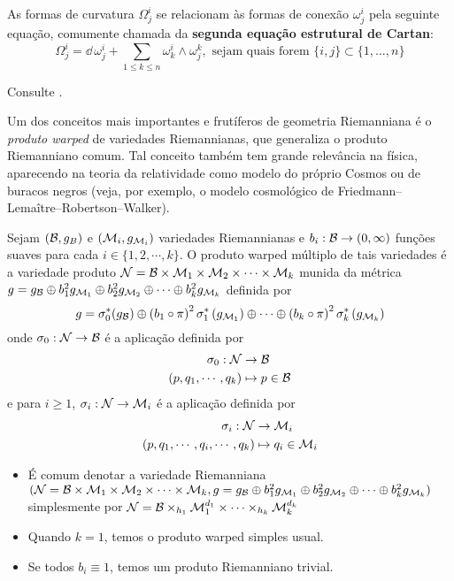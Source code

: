 \begin{teorema}\label{SegEqEstrCartan}
As formas de curvatura $\Omega^{i}_j$ se relacionam às formas de conexão $\omega^{i}_j$ pela seguinte equação, comumente chamada da \textbf{segunda equação estrutural de Cartan}:
\[
\Omega^{i}_j = \dd \, \omega^{i}_j + \sum_{1 \leq k \leq n} \omega^{i}_k \wedge \omega^k_j, \text{ sejam quais forem } \{i, j\} \subset \{1, \ldots, n \}
\]
\end{teorema}
\begin{demm}
Consulte .
\end{demm}


Um dos conceitos mais importantes e frutíferos de geometria Riemanniana é o \emph{produto warped} de variedades Riemannianas, que generaliza o produto Riemanniano comum. Tal conceito também tem grande relevância na física, aparecendo na teoria da relatividade como modelo do próprio Cosmos ou de buracos negros (veja, por exemplo, o modelo cosmológico de Friedmann–Lemaître–Robertson–Walker). 


\begin{deff}
Sejam $(\mathcal{B}, g_{B})$ e $(\mathcal{M}_i, g_{\mathcal{M}_i})$ variedades Riemannianas e $b_i: \mathcal{B} \to (0, \infty)$ funções suaves para cada $i \in \{1, 2, \cdots, k \}$. O produto warped múltiplo de tais variedades é a variedade produto $\mathcal{N} = \mathcal{B} \times \mathcal{M}_1 \times \mathcal{M}_2 \times \cdots \times \mathcal{M}_k $ munida da métrica $g = g_{\mathcal{B}} \oplus b_1^2 g_{\mathcal{M}_1} \oplus b_2^2 g_{\mathcal{M}_2} \oplus \cdots \oplus b_{k}^2 g_{\mathcal{M}_k}$ definida por
\[
g = \sigma_0^{*} (g_{\mathcal{B}}) \oplus \left(b_1 \circ \pi \right)^2 \sigma_1^{*}\left(g_{\mathcal{M}_1} \right ) \oplus \cdots \oplus \left(b_k \circ \pi \right)^2 \sigma_{k}^{*} \left( g_{\mathcal{M}_k} \right)
\]
onde $\sigma_0 : \mathcal{N} \to \mathcal{B}$ é a aplicação definida por
\begin{align*}
\sigma_0: \mathcal{N} &\to \mathcal{B} \\
(p, q_1, \cdots, q_k) &\mapsto p \in \mathcal{B}
\end{align*}
e para $i \geq 1$, $\sigma_i : \mathcal{N} \to \mathcal{M}_i$ é a aplicação definida por
\begin{align*}
\sigma_i: \mathcal{N} &\to \mathcal{M}_i \\
(p, q_1, \cdots, q_i, \cdots, q_k) &\mapsto q_i \in \mathcal{M}_i
\end{align*}
\end{deff}


\begin{oobs}
\begin{itemize} \item É comum denotar a variedade Riemanniana $(\mathcal{N}  =  \mathcal{B} \times \mathcal{M}_1 \times \mathcal{M}_2 \times \cdots \times \mathcal{M}_k, g = g_{\mathcal{B}} \oplus b_1^2 g_{\mathcal{M}_1} \oplus b_2^2 g_{\mathcal{M}_2} \oplus \cdots \oplus b_{k}^2 g_{\mathcal{M}_k})$ simplesmente por $\mathcal{N} = \mathcal{B} \times_{h_1} \mathcal{M}_1^{d_1} \times \cdots \times_{h_k} \mathcal{M}_{k}^{d_k}$
\item Quando $k = 1$, temos o produto warped simples usual. 
\item Se todos $b_i \equiv 1$, temos um produto Riemanniano trivial. 
\end{itemize}
\end{oobs}

